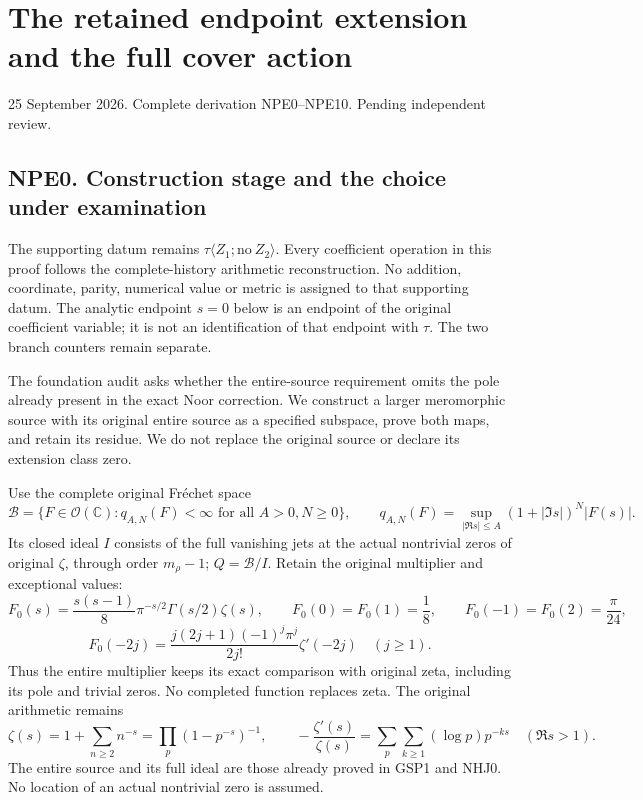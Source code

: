\section{The retained endpoint extension and the full cover
action}\label{the-retained-endpoint-extension-and-the-full-cover-action}

25 September 2026. Complete derivation NPE0--NPE10. Pending independent
review.

\subsection{NPE0. Construction stage and the choice under
examination}\label{npe0.-construction-stage-and-the-choice-under-examination}

The supporting datum remains
\(\tau\langle Z_1;\mathrm{no}\ Z_2\rangle\). Every coefficient operation
in this proof follows the complete-history arithmetic reconstruction. No
addition, coordinate, parity, numerical value or metric is assigned to
that supporting datum. The analytic endpoint \(s=0\) below is an
endpoint of the original coefficient variable; it is not an
identification of that endpoint with \(\tau\). The two branch counters
remain separate.

The foundation audit asks whether the entire-source requirement omits
the pole already present in the exact Noor correction. We construct a
larger meromorphic source with its original entire source as a specified
subspace, prove both maps, and retain its residue. We do not replace the
original source or declare its extension class zero.

Use the complete original Fréchet space \[
\mathcal B=\{F\in\mathcal O(\mathbb C):q_{A,N}(F)<\infty\text{ for all }A>0,N\ge0\},\qquad
q_{A,N}(F)=\sup_{|\Re s|\le A}(1+|\Im s|)^N|F(s)|.
\tag{NPE0.1}
\] Its closed ideal \(I\) consists of the full vanishing jets at the
actual nontrivial zeros of original \(\zeta\), through order
\(m_\rho-1\); \(Q=\mathcal B/I\). Retain the original multiplier and
exceptional values: \[
F_0(s)=\frac{s(s-1)}8\pi^{-s/2}\Gamma(s/2)\zeta(s),\qquad
F_0(0)=F_0(1)=\frac18,\qquad F_0(-1)=F_0(2)=\frac\pi{24},
\] \[
F_0(-2j)=\frac{j(2j+1)(-1)^j\pi^j}{2j!}\zeta'(-2j)\quad(j\ge1).
\tag{NPE0.2}
\] Thus the entire multiplier keeps its exact comparison with original
zeta, including its pole and trivial zeros. No completed function
replaces zeta. The original arithmetic remains \[
\zeta(s)=1+\sum_{n\ge2}n^{-s}=\prod_p(1-p^{-s})^{-1},\qquad
-\frac{\zeta'(s)}{\zeta(s)}=\sum_p\sum_{k\ge1}(\log p)p^{-ks}\quad(\Re s>1).
\tag{NPE0.3}
\] The entire source and its full ideal are those already proved in GSP1
and NHJ0. No location of an actual nontrivial zero is assumed.

